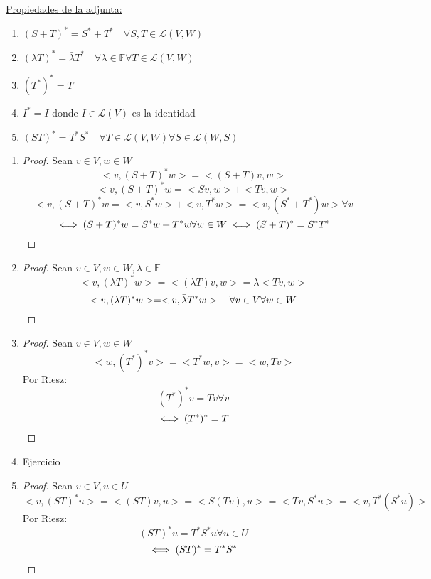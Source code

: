 \documentclass[11pt]{book}
\newcommand{\set}[1]{\mathbb{#1}}
\theoremstyle{definition}
\begin{document}
\underline{Propiedades de la adjunta:}
\begin{enumerate}[label=\alph*)]
	\item $(S+T)^*=S^*+T^*\quad\forall S,T\in \mathcal{L}(V,W)$

	\item $(\lambda T)^*=\bar{\lambda}T^*\quad\forall\lambda\in\set{F}\forall T\in\mathcal{L}(V,W)$

	\item $(T^*)^*=T$

	\item $I^*=I$ donde $I\in\mathcal{L}(V)$ es la identidad

	\item $(ST)^*=T^*S^*\quad\forall T\in\mathcal{L}(V,W)\forall S\in\mathcal{L}(W,S)$
\end{enumerate}
\begin{enumerate}[label=\alph*)]
	\item \begin{proof}
		      Sean $v\in V,w\in W$
		      \[<v,(S+T)^*w>=<(S+T)v,w>\]
		      \[<v,(S+T)^*w=<Sv,w>+<Tv,w>\]
		      \[<v,(S+T)^*w=<v,S^*w>+<v,T^*w>=<v,(S^*+T^*)w>\forall v\]
		      \[\iff (S+T)^*w=S^*w+T^*w\forall w\in W\iff (S+T)^*=S^*T^*\qedhere\]
	      \end{proof}

	\item \begin{proof}
		      Sean $v\in V,w\in W,\lambda\in\set{F}$
		      \[<v,(\lambda T)^*w>=<(\lambda T)v,w>=\lambda<Tv,w>\]
		      \[<v,(\lambda T)^*w>=<v,\bar{\lambda}T^*w>\quad\forall v\in V\forall w\in W\qedhere\]
	      \end{proof}

	\item \begin{proof}
		      Sean $v\in V,w\in W$
		      \[<w,(T^*)^*v>=<T^*w,v>=<w,Tv>\]
		      Por Riesz:
		      \[(T^*)^*v=Tv\forall v\]
		      \[\iff (T^*)^*=T\qedhere\]
	      \end{proof}

	\item Ejercicio

	\item \begin{proof}
		      Sean $v\in V, u\in U$
		      \[<v,(ST)^*u>=<(ST)v,u>=<S(Tv),u>=<Tv,S^*u>=<v,T^*(S^*u)>\]
		      Por Riesz:
		      \[(ST)^*u=T^*S^*u\forall u\in U\]
		      \[\iff (ST)^*=T^*S^*\qedhere\]
	      \end{proof}
\end{enumerate}
\end{document}
